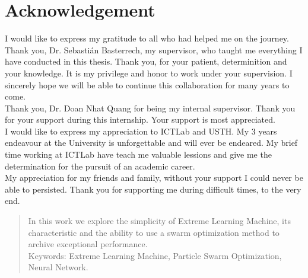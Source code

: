 \documentclass[13pt]{article}
\begin{document}
\section*{Acknowledgement}
I would like to express my gratitude to all who had helped me on the journey.\\
Thank you, Dr. Sebastián Basterrech, my supervisor, who taught me everything I have conducted in this thesis. Thank you, for your patient, determinition and your knowledge. It is my privilege and honor to work under your supervision. I sincerely hope we will be able to continue this collaboration for many years to come.\\
Thank you, Dr. Doan Nhat Quang for being my internal supervisor. Thank you for your support during this internship. Your support is most appreciated.\\
I would like to express my appreciation to ICTLab and USTH. My 3 years endeavour at the University is unforgettable and will ever be endeared. My brief time working at ICTLab have teach me valuable lessions and give me the determination for the pursuit of an academic career.\\
My appreciation for my friends and family, without your support I could never be able to persisted. Thank you for supporting me during difficult times, to the very end.
\newpage
\begin{abstract}
    In this work we explore the simplicity of Extreme Learning Machine, its characteristic and the ability to use a swarm optimization method to archive exceptional performance.\\
    Keywords: Extreme Learning Machine, Particle Swarm Optimization, Neural Network.
\end{abstract}
\newpage
\end{document}
